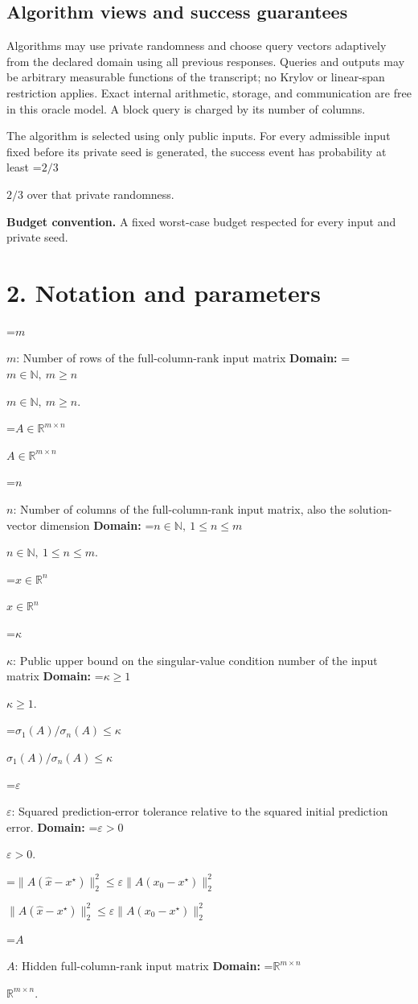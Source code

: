 \documentclass[10pt,a4paper]{article}
\newcommand{\AtlasMath}[1]{\par\begingroup\centering\setbox0=\hbox{$\displaystyle #1$}\ifdim\wd0>1.4\linewidth\typeout{ATLAS WIDE FORMULA: \the\wd0}\fi\ifdim\wd0>\linewidth\resizebox{\linewidth}{!}{\box0}\else\box0\fi\par\endgroup}
\newcommand{\AtlasInlineMath}[1]{\begingroup\setbox0=\hbox{$#1$}\ifdim\wd0>.4\linewidth\endgroup\AtlasMath{#1}\else\endgroup$#1$\fi}
\begin{document}
\subsection{Algorithm views and success guarantees}
Algorithms may use private randomness and choose query vectors adaptively from the declared domain using all previous responses. Queries and outputs may be arbitrary measurable functions of the transcript; no Krylov or linear-span restriction applies. Exact internal arithmetic, storage, and communication are free in this oracle model. A block query is charged by its number of columns.

The algorithm is selected using only public inputs. For every admissible input fixed before its private seed is generated, the success event has probability at least \AtlasInlineMath{2/3} over that private randomness.

\textbf{Budget convention.} A fixed worst-case budget respected for every input and private seed.

\section{2. Notation and parameters}
\AtlasInlineMath{m}: Number of rows of the full-column-rank input matrix \textbf{Domain:} \AtlasInlineMath{m\in\mathbb N,\ m\ge n}.

\AtlasInlineMath{A\in\mathbb R^{m\times n}}

\AtlasInlineMath{n}: Number of columns of the full-column-rank input matrix, also the solution-vector dimension \textbf{Domain:} \AtlasInlineMath{n\in\mathbb N,\ 1\le n\le m}.

\AtlasInlineMath{x\in\mathbb R^n}

\AtlasInlineMath{\kappa}: Public upper bound on the singular-value condition number of the input matrix \textbf{Domain:} \AtlasInlineMath{\kappa\ge1}.

\AtlasInlineMath{\sigma_1(A)/\sigma_n(A)\le\kappa}

\AtlasInlineMath{\varepsilon}: Squared prediction-error tolerance relative to the squared initial prediction error. \textbf{Domain:} \AtlasInlineMath{\varepsilon>0}.

\AtlasInlineMath{\|A(\widehat x-x^\star)\|_2^2\le\varepsilon\|A(x_0-x^\star)\|_2^2}

\AtlasInlineMath{A}: Hidden full-column-rank input matrix \textbf{Domain:} \AtlasInlineMath{\mathbb R^{m\times n}}.
\end{document}
